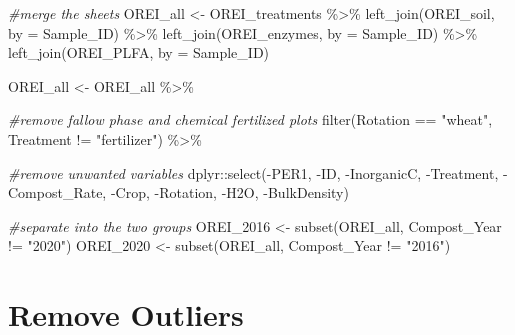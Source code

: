 \documentclass[
]{article}
\newenvironment{Shaded}{\begin{snugshade}}{\end{snugshade}}
\newcommand{\AttributeTok}[1]{\textcolor[rgb]{0.77,0.63,0.00}{#1}}
\newcommand{\CommentTok}[1]{\textcolor[rgb]{0.56,0.35,0.01}{\textit{#1}}}
\newcommand{\FunctionTok}[1]{\textcolor[rgb]{0.00,0.00,0.00}{#1}}
\newcommand{\NormalTok}[1]{#1}
\newcommand{\OtherTok}[1]{\textcolor[rgb]{0.56,0.35,0.01}{#1}}
\newcommand{\SpecialCharTok}[1]{\textcolor[rgb]{0.00,0.00,0.00}{#1}}
\newcommand{\StringTok}[1]{\textcolor[rgb]{0.31,0.60,0.02}{#1}}
\begin{document}
\begin{Shaded}
\begin{Highlighting}[]
\CommentTok{\#merge the sheets}
\NormalTok{OREI\_all }\OtherTok{\textless{}{-}}\NormalTok{ OREI\_treatments }\SpecialCharTok{\%\textgreater{}\%} 
  \FunctionTok{left\_join}\NormalTok{(OREI\_soil, }\AttributeTok{by =} \StringTok{\textquotesingle{}Sample\_ID\textquotesingle{}}\NormalTok{) }\SpecialCharTok{\%\textgreater{}\%} 
  \FunctionTok{left\_join}\NormalTok{(OREI\_enzymes, }\AttributeTok{by =} \StringTok{\textquotesingle{}Sample\_ID\textquotesingle{}}\NormalTok{) }\SpecialCharTok{\%\textgreater{}\%} 
  \FunctionTok{left\_join}\NormalTok{(OREI\_PLFA, }\AttributeTok{by =} \StringTok{\textquotesingle{}Sample\_ID\textquotesingle{}}\NormalTok{)}

\NormalTok{OREI\_all }\OtherTok{\textless{}{-}}\NormalTok{ OREI\_all }\SpecialCharTok{\%\textgreater{}\%} 
  
\CommentTok{\#remove fallow phase and chemical fertilized plots}
  \FunctionTok{filter}\NormalTok{(Rotation }\SpecialCharTok{==} \StringTok{"wheat"}\NormalTok{, Treatment }\SpecialCharTok{!=} \StringTok{"fertilizer"}\NormalTok{) }\SpecialCharTok{\%\textgreater{}\%} 
  
\CommentTok{\#remove unwanted variables}
\NormalTok{ dplyr}\SpecialCharTok{::}\FunctionTok{select}\NormalTok{(}\SpecialCharTok{{-}}\NormalTok{PER1, }\SpecialCharTok{{-}}\NormalTok{ID, }\SpecialCharTok{{-}}\NormalTok{InorganicC, }\SpecialCharTok{{-}}\NormalTok{Treatment, }\SpecialCharTok{{-}}\NormalTok{Compost\_Rate, }
         \SpecialCharTok{{-}}\NormalTok{Crop, }\SpecialCharTok{{-}}\NormalTok{Rotation, }\SpecialCharTok{{-}}\NormalTok{H2O, }\SpecialCharTok{{-}}\NormalTok{BulkDensity) }

\CommentTok{\#separate into the two groups}
\NormalTok{OREI\_2016 }\OtherTok{\textless{}{-}} \FunctionTok{subset}\NormalTok{(OREI\_all, Compost\_Year }\SpecialCharTok{!=} \StringTok{"2020"}\NormalTok{)}
\NormalTok{OREI\_2020 }\OtherTok{\textless{}{-}} \FunctionTok{subset}\NormalTok{(OREI\_all, Compost\_Year }\SpecialCharTok{!=} \StringTok{"2016"}\NormalTok{)}
\end{Highlighting}
\end{Shaded}

\hypertarget{remove-outliers}{%
\section{Remove Outliers}\label{remove-outliers}}
\end{document}
